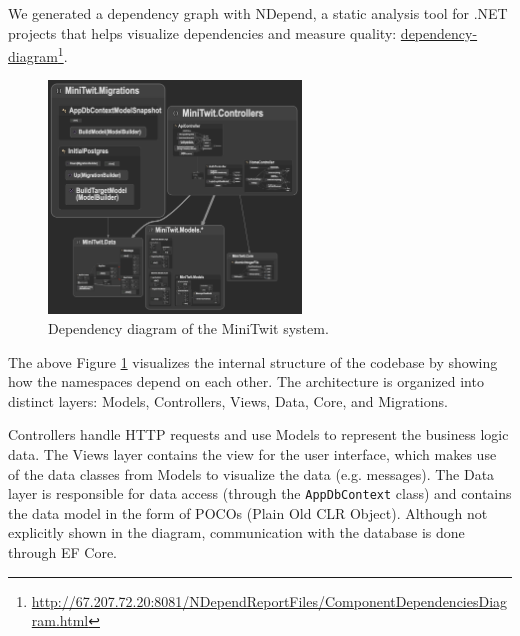 \documentclass[12pt,a4paper,reqno]{report}
\begin{document}
We generated a dependency graph with NDepend, a static analysis tool for .NET projects that helps visualize dependencies and measure quality: \href{http://67.207.72.20:8081/NDependReportFiles/ComponentDependenciesDiagram.html}{dependency-diagram}\footnote{\url{http://67.207.72.20:8081/NDependReportFiles/ComponentDependenciesDiagram.html}}.

\vspace*{0.5cm}

\begin{figure}[H]
    \centering
    \includegraphics[width=0.60\textwidth]{images/MiniTwit-DependencyDiagram.png}
    \caption{Dependency diagram of the MiniTwit system.}
    \label{fig:minitwit-diagram}
\end{figure}

The above Figure \ref{fig:minitwit-diagram} visualizes the internal structure of the codebase by showing how the namespaces depend on each other. The architecture is organized into distinct layers: Models, Controllers, Views, Data, Core, and Migrations.

Controllers handle HTTP requests and use Models to represent the business logic data. The Views layer contains the view for the user interface, which makes use of the data classes from Models to visualize the data (e.g. messages). The Data layer is responsible for data access (through the \texttt{AppDbContext} class) and contains the data model in the form of POCOs (Plain Old CLR Object). Although not explicitly shown in the diagram, communication with the database is done through EF Core.

\vspace*{0.5cm}
\end{document}

